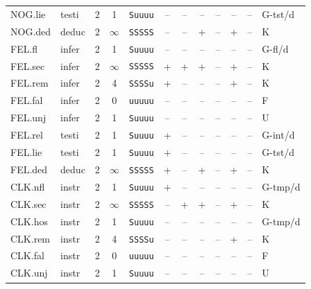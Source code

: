 {\begin{longtable}{@{}llcccccccccl@{}}
NOG.lie & testi & 2 & 1 & \texttt{Suuuu} & \textsf{--} & \textsf{--} & \textsf{--} & \textsf{--} & \textsf{--} & -- & G-tst/d \\
NOG.ded & deduc & 2 & $\infty$ & \texttt{SSSSS} & \textsf{--} & \textsf{--} & \textsf{+} & \textsf{--} & \textsf{+} & -- & K \\
FEL.fl & infer & 2 & 1 & \texttt{Suuuu} & \textsf{--} & \textsf{--} & \textsf{--} & \textsf{--} & \textsf{--} & -- & G-fl/d \\
FEL.sec & infer & 2 & $\infty$ & \texttt{SSSSS} & \textsf{+} & \textsf{+} & \textsf{+} & \textsf{--} & \textsf{+} & -- & K \\
FEL.rem & infer & 2 & 4 & \texttt{SSSSu} & \textsf{+} & \textsf{--} & \textsf{--} & \textsf{--} & \textsf{+} & -- & K \\
FEL.fal & infer & 2 & 0 & \texttt{uuuuu} & \textsf{--} & \textsf{--} & \textsf{--} & \textsf{--} & \textsf{--} & -- & F \\
FEL.unj & infer & 2 & 1 & \texttt{Suuuu} & \textsf{--} & \textsf{--} & \textsf{--} & \textsf{--} & \textsf{--} & -- & U \\
FEL.rel & testi & 2 & 1 & \texttt{Suuuu} & \textsf{+} & \textsf{--} & \textsf{--} & \textsf{--} & \textsf{--} & -- & G-int/d \\
FEL.lie & testi & 2 & 1 & \texttt{Suuuu} & \textsf{+} & \textsf{--} & \textsf{--} & \textsf{--} & \textsf{--} & -- & G-tst/d \\
FEL.ded & deduc & 2 & $\infty$ & \texttt{SSSSS} & \textsf{+} & \textsf{--} & \textsf{+} & \textsf{--} & \textsf{+} & -- & K \\
CLK.nfl & instr & 2 & 1 & \texttt{Suuuu} & \textsf{+} & \textsf{--} & \textsf{--} & \textsf{--} & \textsf{--} & -- & G-tmp/d \\
CLK.sec & instr & 2 & $\infty$ & \texttt{SSSSS} & \textsf{--} & \textsf{+} & \textsf{+} & \textsf{--} & \textsf{+} & -- & K \\
CLK.hos & instr & 2 & 1 & \texttt{Suuuu} & \textsf{--} & \textsf{--} & \textsf{--} & \textsf{--} & \textsf{--} & -- & G-tmp/d \\
CLK.rem & instr & 2 & 4 & \texttt{SSSSu} & \textsf{--} & \textsf{--} & \textsf{--} & \textsf{--} & \textsf{+} & -- & K \\
CLK.fal & instr & 2 & 0 & \texttt{uuuuu} & \textsf{--} & \textsf{--} & \textsf{--} & \textsf{--} & \textsf{--} & -- & F \\
CLK.unj & instr & 2 & 1 & \texttt{Suuuu} & \textsf{--} & \textsf{--} & \textsf{--} & \textsf{--} & \textsf{--} & -- & U \\

\end{longtable}}
